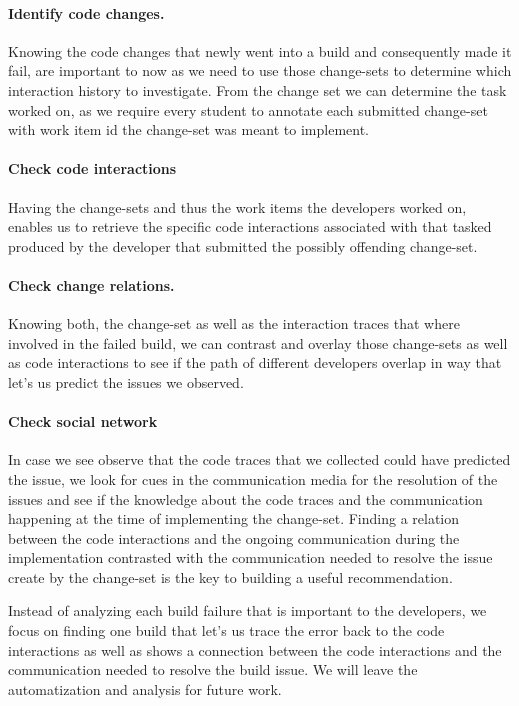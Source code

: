 \paragraph{Identify code changes.}
Knowing the code changes that newly went into a build and consequently made it fail, are important to now as we need to use those change-sets to determine which interaction history to investigate.
From the change set we can determine the task worked on, as we require every student to annotate each submitted change-set with work item id the change-set was meant to implement.

\paragraph{Check code interactions}
Having the change-sets and thus the work items the developers worked on, enables us to retrieve the specific code interactions associated with that tasked produced by the developer that submitted the possibly offending change-set.

\paragraph{Check change relations.}
Knowing both, the change-set as well as the interaction traces that where involved in the failed build, we can contrast and overlay those change-sets as well as code interactions to see if the path of different developers overlap in way that let's us predict the issues we observed.

\paragraph{Check social network}
In case we see observe that the code traces that we collected could have predicted the issue, we look for cues in the communication media for the resolution of the issues and see if the knowledge about the code traces and the communication happening at the time of implementing the change-set.
Finding a relation between the code interactions and the ongoing communication during the implementation contrasted with the communication needed to resolve the issue create by the change-set is the key to building a useful recommendation.

Instead of analyzing each build failure that is important to the developers, we focus on finding one build that let's us trace the error back to the code interactions as well as shows a connection between the code interactions and the communication needed to resolve the build issue.
We will leave the automatization and analysis for future work.

